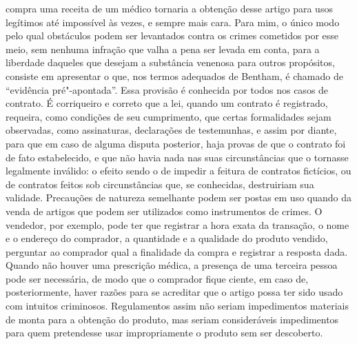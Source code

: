 compra uma receita de um médico tornaria a obtenção desse artigo para
usos legítimos até impossível às vezes, e sempre mais cara. Para mim, o
único modo pelo qual obstáculos podem ser levantados contra
os crimes cometidos por esse meio, sem nenhuma infração que valha a
pena ser levada em conta, para a liberdade daqueles que desejam a
substância venenosa para outros propósitos, consiste em apresentar o
que, nos termos adequados de Bentham, é chamado de ``evidência
pré"-apontada''. Essa provisão é conhecida por todos nos casos de
contrato. É corriqueiro e correto que a lei, quando um contrato é
registrado, requeira, como condições de seu cumprimento, que certas
formalidades sejam observadas, como assinaturas, declarações de
testemunhas, e assim por diante, para que em caso de alguma disputa
posterior, haja provas de que o contrato foi de fato estabelecido, e
que não havia nada nas suas circunstâncias que o tornasse legalmente
inválido: o efeito sendo o de impedir a feitura de contratos
fictícios, ou de contratos feitos sob circunstâncias que, se
conhecidas, destruiriam sua validade. Precauções de natureza
semelhante podem ser postas em uso quando da venda de artigos que
podem ser utilizados como instrumentos de crimes. O vendedor, por
exemplo, pode ter que registrar a hora exata da transação, o nome e o
endereço do comprador, a quantidade e a qualidade do produto vendido,
perguntar ao comprador qual a finalidade da compra e registrar a
resposta dada. Quando não houver uma prescrição médica, a presença de
uma terceira pessoa pode ser necessária, de modo que o comprador fique
ciente, em caso de, posteriormente, haver razões para se acreditar que o
artigo possa ter sido usado com intuitos criminosos. Regulamentos assim
não seriam impedimentos materiais de monta para a obtenção do produto,
mas seriam consideráveis impedimentos para quem pretendesse usar impropriamente o
produto sem ser descoberto. 

